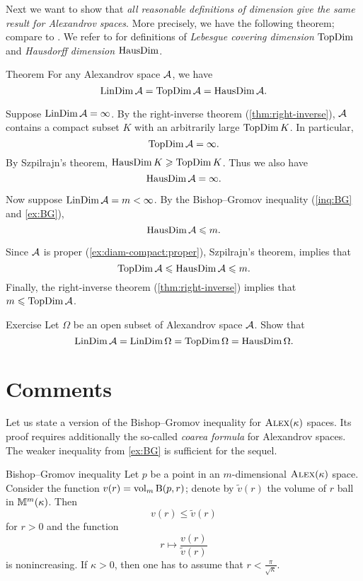 Next we want to show that \textit{all reasonable definitions of dimension give the same result for Alexandrov spaces}.
More precisely, we have the following theorem; compare to \cite[15.16]{alexander-kapovitch-petrunin2024}.
We refer to \cite{hurewicz-wallman} for definitions of \emph{Lebesgue covering dimension} \index{$\TopDim$}$\TopDim$ and \emph{Hausdorff dimension} \index{$\HausDim$}$\HausDim$.

\begin{thm}{Theorem}\label{thm:dim=dim}
For any Alexandrov space $\mathcal{A}$, we have
\[\mathop{\rm LinDim}\nolimits \mathcal{A}=\mathop{\rm TopDim}\nolimits \mathcal{A}=\mathop{\rm HausDim}\nolimits \mathcal{A}.\]
\end{thm}

Suppose $\mathop{\rm LinDim}\nolimits \mathcal{A}=\infty$.
By the right-inverse theorem (\ref{thm:right-inverse}), $\mathcal{A}$ contains a compact subset $K$ with an arbitrarily large $\mathop{\rm TopDim}\nolimits K$.
In particular,
\[\mathop{\rm TopDim}\nolimits\mathcal{A}=\infty.\] 
By Szpilrajn's theorem,
$\mathop{\rm HausDim}\nolimits K\geqslant \mathop{\rm TopDim}\nolimits K$.
Thus we also have 
\[\mathop{\rm HausDim}\nolimits\mathcal{A}=\infty.\]

Now suppose $\mathop{\rm LinDim}\nolimits \mathcal{A}=m<\infty$.
By the Bishop--Gromov inequality (\ref{inq:BG} and \ref{ex:BG}), 
\[\mathop{\rm HausDim}\nolimits\mathcal{A}\leqslant m.\]

Since $\mathcal{A}$ is proper (\ref{ex:diam-compact:proper}),
Szpilrajn's theorem, implies that
\[\mathop{\rm TopDim}\nolimits\mathcal{A}\leqslant \mathop{\rm HausDim}\nolimits\mathcal{A}\leqslant m.\]
Finally, the right-inverse theorem (\ref{thm:right-inverse}) implies that $m\leqslant\mathop{\rm TopDim}\nolimits\mathcal{A}$.
\qeds

\begin{thm}{Exercise}\label{ex:dim=dim}
Let $\Omega$ be an open subset of Alexandrov space $\mathcal{A}$.
Show that 
\[\mathop{\rm LinDim}\nolimits \mathcal{A}=\mathop{\rm LinDim}\nolimits \Omega=\mathop{\rm TopDim}\nolimits \Omega=\mathop{\rm HausDim}\nolimits \Omega.\]
\end{thm}

\section{Comments}

Let us state a version of the Bishop--Gromov inequality for $\textsc{Alex}(\kappa)$ spaces.
Its proof requires additionally the so-called \textit{coarea formula} for Alexandrov spaces. 
The weaker inequality from \ref{ex:BG} is sufficient for the sequel.

\begin{thm}{Bishop--Gromov inequality}\label{inq:BG+}
Let $p$ be a point in an $m$-dimensional $\textsc{Alex}(\kappa)$ space.
Consider the function $v(r)=\operatorname{\rm vol}\nolimits_m\mathrm{B}{}(p,r)$;
denote by $\tilde v(r)$ the volume of $r$ ball in $\mathbb{M}^m(\kappa)$.
Then 
\[v(r)\le \tilde v(r)\]
for $r>0$ and the function 
\[r\mapsto \frac{v(r)}{\tilde v(r)}\] is nonincreasing.
If $\kappa>0$, then one has to assume that $r<\tfrac\pi{\sqrt\kappa}$.
\end{thm}

